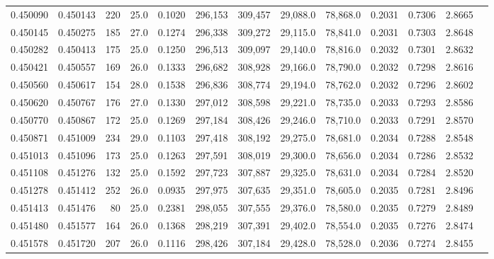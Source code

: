 \begin{tabular}{rrrrrrrrrrrrr}
0.450090 & 0.450143 &   220 & 25.0 &                                     0.1020 & 296,153 & 309,457 &  29,088.0 &  78,868.0 & 0.2031 & 0.7306 & 2.8665 \\
0.450145 & 0.450275 &   185 & 27.0 &                                     0.1274 & 296,338 & 309,272 &  29,115.0 &  78,841.0 & 0.2031 & 0.7303 & 2.8648 \\
0.450282 & 0.450413 &   175 & 25.0 &                                     0.1250 & 296,513 & 309,097 &  29,140.0 &  78,816.0 & 0.2032 & 0.7301 & 2.8632 \\
0.450421 & 0.450557 &   169 & 26.0 &                                     0.1333 & 296,682 & 308,928 &  29,166.0 &  78,790.0 & 0.2032 & 0.7298 & 2.8616 \\
0.450560 & 0.450617 &   154 & 28.0 &                                     0.1538 & 296,836 & 308,774 &  29,194.0 &  78,762.0 & 0.2032 & 0.7296 & 2.8602 \\
0.450620 & 0.450767 &   176 & 27.0 &                                     0.1330 & 297,012 & 308,598 &  29,221.0 &  78,735.0 & 0.2033 & 0.7293 & 2.8586 \\
0.450770 & 0.450867 &   172 & 25.0 &                                     0.1269 & 297,184 & 308,426 &  29,246.0 &  78,710.0 & 0.2033 & 0.7291 & 2.8570 \\
0.450871 & 0.451009 &   234 & 29.0 &                                     0.1103 & 297,418 & 308,192 &  29,275.0 &  78,681.0 & 0.2034 & 0.7288 & 2.8548 \\
0.451013 & 0.451096 &   173 & 25.0 &                                     0.1263 & 297,591 & 308,019 &  29,300.0 &  78,656.0 & 0.2034 & 0.7286 & 2.8532 \\
0.451108 & 0.451276 &   132 & 25.0 &                                     0.1592 & 297,723 & 307,887 &  29,325.0 &  78,631.0 & 0.2034 & 0.7284 & 2.8520 \\
0.451278 & 0.451412 &   252 & 26.0 &                                     0.0935 & 297,975 & 307,635 &  29,351.0 &  78,605.0 & 0.2035 & 0.7281 & 2.8496 \\
0.451413 & 0.451476 &    80 & 25.0 &                                     0.2381 & 298,055 & 307,555 &  29,376.0 &  78,580.0 & 0.2035 & 0.7279 & 2.8489 \\
0.451480 & 0.451577 &   164 & 26.0 &                                     0.1368 & 298,219 & 307,391 &  29,402.0 &  78,554.0 & 0.2035 & 0.7276 & 2.8474 \\
0.451578 & 0.451720 &   207 & 26.0 &                                     0.1116 & 298,426 & 307,184 &  29,428.0 &  78,528.0 & 0.2036 & 0.7274 & 2.8455 \\

\end{tabular}
